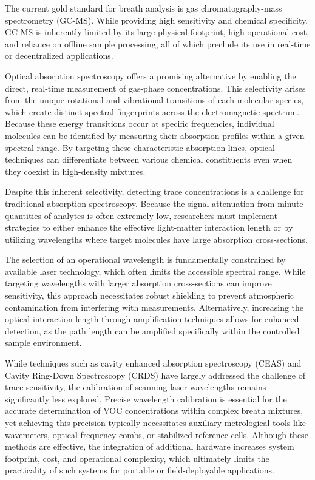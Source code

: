 \documentclass[12pt]{report}
\begin{document}
	The current gold standard for breath analysis is gas chromatography-mass spectrometry (GC-MS). While providing high sensitivity and chemical specificity, GC-MS is inherently limited by its large physical footprint, high operational cost, and reliance on offline sample processing, all of which preclude its use in real-time or decentralized applications.
	
	Optical absorption spectroscopy offers a promising alternative by enabling the direct, real-time measurement of gas-phase concentrations. This selectivity arises from the unique rotational and vibrational transitions of each molecular species, which create distinct spectral fingerprints across the electromagnetic spectrum. Because these energy transitions occur at specific frequencies, individual molecules can be identified by measuring their absorption profiles within a given spectral range. By targeting these characteristic absorption lines, optical techniques can differentiate between various chemical constituents even when they coexist in high-density mixtures.
	
	Despite this inherent selectivity, detecting trace concentrations is a challenge for traditional absorption spectroscopy. Because the signal attenuation from minute quantities of analytes is often extremely low, researchers must implement strategies to either enhance the effective light-matter interaction length or by utilizing wavelengths where target molecules have large absorption cross-sections.
	
	The selection of an operational wavelength is fundamentally constrained by available laser technology, which often limits the accessible spectral range. While targeting wavelengths with larger absorption cross-sections can improve sensitivity, this approach necessitates robust shielding to prevent atmospheric contamination from interfering with measurements. Alternatively, increasing the optical interaction length through amplification techniques allows for enhanced detection, as the path length can be amplified specifically within the controlled sample environment.
	
	While techniques such as cavity enhanced absorption spectroscopy (CEAS) and Cavity Ring-Down Spectroscopy (CRDS) have largely addressed the challenge of trace sensitivity, the calibration of scanning laser wavelengths remains significantly less explored. Precise wavelength calibration is essential for the accurate determination of VOC concentrations within complex breath mixtures, yet achieving this precision typically necessitates auxiliary metrological tools like wavemeters, optical frequency combs, or stabilized reference cells. Although these methods are effective, the integration of additional hardware increases system footprint, cost, and operational complexity, which ultimately limits the practicality of such systems for portable or field-deployable applications.
	
\end{document}
